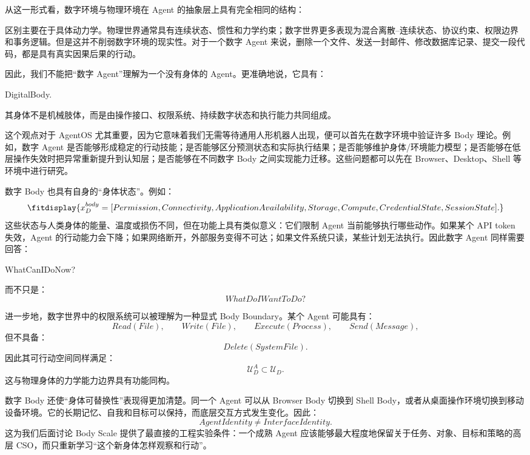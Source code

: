 从这一形式看，数字环境与物理环境在 Agent 的抽象层上具有完全相同的结构：
\begin{statementbox}
\centering
{}
\end{statementbox}
区别主要在于具体动力学。物理世界通常具有连续状态、惯性和力学约束；数字世界更多表现为混合离散--连续状态、协议约束、权限边界和事务逻辑。但是这并不削弱数字环境的现实性。对于一个数字 Agent 来说，删除一个文件、发送一封邮件、修改数据库记录、提交一段代码，都是具有真实因果后果的行动。

因此，我们不能把“数字 Agent”理解为一个没有身体的 Agent。更准确地说，它具有：
\begin{statementbox}
DigitalBody.
\end{statementbox}
其身体不是机械肢体，而是由操作接口、权限系统、持续数字状态和执行能力共同组成。

这个观点对于 AgentOS 尤其重要，因为它意味着我们无需等待通用人形机器人出现，便可以首先在数字环境中验证许多 Body 理论。例如，数字 Agent 是否能够形成稳定的行动技能；是否能够区分预测状态和实际执行结果；是否能够维护身体/环境能力模型；是否能够在低层操作失效时把异常重新提升到认知层；是否能够在不同数字 Body 之间实现能力迁移。这些问题都可以先在 Browser、Desktop、Shell 等环境中进行研究。

数字 Body 也具有自身的“身体状态”。例如：
\[
\fitdisplay{
x_D^{body}
=
[
Permission,
Connectivity,
ApplicationAvailability,
Storage,
Compute,
CredentialState,
SessionState
].
}
\]
这些状态与人类身体的能量、温度或损伤不同，但在功能上具有类似意义：它们限制 Agent 当前能够执行哪些动作。如果某个 API token 失效，Agent 的行动能力会下降；如果网络断开，外部服务变得不可达；如果文件系统只读，某些计划无法执行。因此数字 Agent 同样需要回答：
\begin{statementbox}
WhatCanIDoNow?
\end{statementbox}
而不只是：
\[
WhatDoIWantToDo?
\]

进一步地，数字世界中的权限系统可以被理解为一种显式 Body Boundary。某个 Agent 可能具有：
\[
Read(File),
\qquad
Write(File),
\qquad
Execute(Process),
\qquad
Send(Message),
\]
但不具备：
\[
Delete(SystemFile).
\]
因此其可行动空间同样满足：
\[
\mathcal U_D^{A}
\subset
\mathcal U_D.
\]
这与物理身体的力学能力边界具有功能同构。

数字 Body 还使“身体可替换性”表现得更加清楚。同一个 Agent 可以从 Browser Body 切换到 Shell Body，或者从桌面操作环境切换到移动设备环境。它的长期记忆、自我和目标可以保持，而底层交互方式发生变化。因此：
\[
\boxed{
AgentIdentity
\neq
InterfaceIdentity.
}
\]
这为我们后面讨论 Body Scale 提供了最直接的工程实验条件：一个成熟 Agent 应该能够最大程度地保留关于任务、对象、目标和策略的高层 CSO，而只重新学习“这个新身体怎样观察和行动”。

